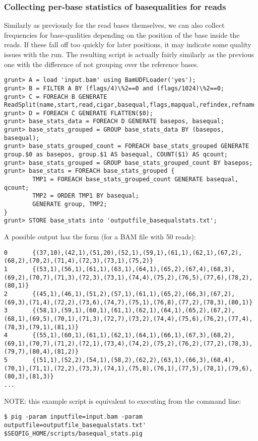 \subsubsection{Collecting per-base statistics of basequalities for reads}
Similarly as previously for the read bases themselves, we can also collect
frequencies for base-qualities depending on the position of the base inside
the reads. If these fall off too quickly for later positions, it may
indicate some quality issues with the run. The resulting script is actually
fairly similarly as the previous one with the difference of not grouping
over the reference bases.
\begin{lstlisting}
grunt> A = load 'input.bam' using BamUDFLoader('yes');
grunt> B = FILTER A BY (flags/4)\%2==0 and (flags/1024)\%2==0;
grunt> C = FOREACH B GENERATE ReadSplit(name,start,read,cigar,basequal,flags,mapqual,refindex,refname,attributes#'MD');
grunt> D = FOREACH C GENERATE FLATTEN($0);
grunt> base_stats_data = FOREACH D GENERATE basepos, basequal;
grunt> base_stats_grouped = GROUP base_stats_data BY (basepos, basequal);
grunt> base_stats_grouped_count = FOREACH base_stats_grouped GENERATE group.$0 as basepos, group.$1 AS basequal, COUNT($1) AS qcount;
grunt> base_stats_grouped = GROUP base_stats_grouped_count BY basepos;
grunt> base_stats = FOREACH base_stats_grouped {
        TMP1 = FOREACH base_stats_grouped_count GENERATE basequal, qcount;
        TMP2 = ORDER TMP1 BY basequal;
        GENERATE group, TMP2;
}
grunt> STORE base_stats into 'outputfile_basequalstats.txt';
\end{lstlisting}
A possible output has the form (for a BAM file with 50 reads):
\begin{lstlisting}
0       {(37,10),(42,1),(51,20),(52,1),(59,1),(61,1),(62,1),(67,2),(68,2),(70,2),(71,4),(72,3),(73,1),(75,2)}
1       {(53,1),(56,1),(61,1),(63,1),(64,1),(65,2),(67,4),(68,3),(69,2),(70,7),(71,3),(72,3),(73,1),(74,4),(75,2),(76,5),(77,6),(78,2),(80,1)}
2       {(45,1),(46,1),(51,2),(57,1),(61,1),(65,2),(66,3),(67,2),(69,3),(71,4),(72,2),(73,6),(74,7),(75,1),(76,8),(77,2),(78,3),(80,1)}
3       {(58,1),(59,1),(60,1),(61,1),(62,1),(64,1),(65,2),(67,2),(68,1),(69,5),(70,1),(71,3),(72,7),(73,2),(74,4),(75,6),(76,2),(77,4),(78,3),(79,1),(81,1)}
4       {(55,1),(60,1),(61,1),(62,1),(64,1),(66,1),(67,3),(68,2),(69,1),(70,7),(71,2),(72,1),(73,4),(74,2),(75,2),(76,2),(77,2),(78,3),(79,7),(80,4),(81,2)}
5       {(51,1),(52,2),(54,1),(58,2),(62,2),(63,1),(66,3),(68,4),(70,1),(71,1),(72,2),(73,3),(74,1),(75,8),(76,1),(77,5),(78,1),(79,6),(80,3),(81,3)}
...
\end{lstlisting}
NOTE: this example script is equivalent to executing from the command line:
\begin{lstlisting}
$ pig -param inputfile=input.bam -param outputfile=outputfile_basequalstats.txt' $SEQPIG_HOME/scripts/basequal_stats.pig
\end{lstlisting}

